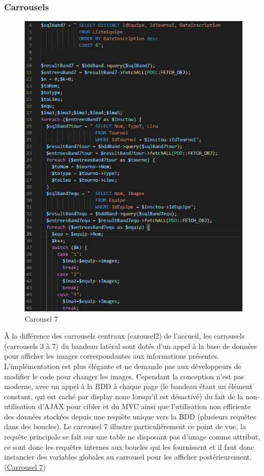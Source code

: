 \documentclass[12pt]{report}
\begin{document}
\subsubsection{Carrousels}
\begin{figure}
\hypertarget{fig-carrousel7}{}
\includegraphics[width=0.95\linewidth]{figures/pt-carrousel7.png} 
\caption{Carousel 7}
\end{figure}
\par
À la différence des carrousels centraux (carousel2) de l’accueil, les carrousels (carrousels 3 à 7) du bandeau latéral sont dotés d’un appel à la base de données pour afficher les images correspondantes aux informations présentes. L’implémentation est plus élégante et ne demande pas aux développeurs de modifier le code pour changer les images. Cependant la conception n’est pas moderne, avec un appel à la BDD à chaque page (le bandeau étant un élément constant, qui est caché par display none lorsqu’il est désactivé) du fait de la non-utilisation d’AJAX pour cibler et du MVC ainsi que l’utilisation non efficiente des données stockées depuis une requête unique vers la BDD (plusieurs requêtes dans des boucles). Le carrousel 7 illustre particulièrement ce point de vue, la requête principale se fait sur une table ne disposant pas d’image comme attribut, ce sont donc les requêtes internes aux boucles qui les fournissent et il faut donc instancier des variables globales au carrousel pour les afficher postérieurement. (\hyperlink{fig-carrousel7}{Carrousel 7})
\end{document}
